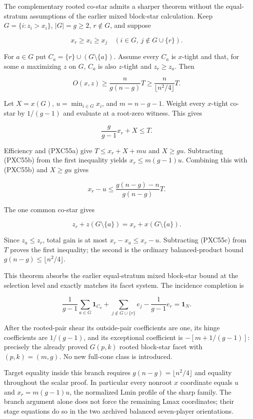 \documentclass[11pt]{article}
\newcommand{\one}{\mathbf 1}
\begin{document}
The complementary rooted co-star admits a sharper theorem without the
equal-stratum assumptions of the earlier mixed block-star calculation.  Keep
$G=\{i:z_i>x_i\}$, $|G|=g\ge2$, $r\notin G$, and suppose

\[
 x_r\ge x_i\ge x_j\quad(i\in G,\ j\notin G\cup\{r\}).                \tag{PXC55a}
\]

For $a\in G$ put $C_a=\{r\}\cup(G\setminus\{a\})$.  Assume every $C_a$
is $x$-tight and that, for some $a$ maximizing $z$ on $G$, $C_a$ is also
$z$-tight and $z_r\ge z_a$.  Then

\[
 \boxed{\qquad
 O(x,z)\ge\frac{n}{g(n-g)}T
          \ge\frac{n}{\lfloor n^2/4\rfloor}T .\qquad}               \tag{PXC55}
\]

Let $X=x(G)$, $u=\min_{i\in G}x_i$, and $m=n-g-1$.  Weight every
$x$-tight co-star by $1/(g-1)$ and evaluate at a root-zero witness.  This
gives

\[
 \frac g{g-1}x_r+X\le T.                            \tag{PXC55b}
\]

Efficiency and (PXC55a) give $T\le x_r+X+mu$ and $X\ge gu$.
Subtracting (PXC55b) from the first inequality yields
$x_r\le m(g-1)u$.  Combining this with (PXC55b) and $X\ge gu$ gives

\[
 x_r-u\le\frac{g(n-g)-n}{g(n-g)}T.                  \tag{PXC55c}
\]

The one common co-star gives

\[
 z_r+z(G\setminus\{a\})=x_r+x(G\setminus\{a\}).
\]

Since $z_a\le z_r$, total gain is at most $x_r-x_a\le x_r-u$.
Subtracting (PXC55c) from $T$ proves the first inequality; the second is the
ordinary balanced-product bound $g(n-g)\le\lfloor n^2/4\rfloor$.

This theorem absorbs the earlier equal-stratum mixed block-star bound at the
selection level and exactly matches its facet system.  The incidence
completion is

\[
 \frac1{g-1}\sum_{a\in G}\one_{C_a}
 +\sum_{j\notin G\cup\{r\}}e_j-\frac1{g-1}e_r=\one_N.               \tag{PXC55d}
\]

After the rooted-pair shear its outside-pair coefficients are one, its hinge
coefficients are $1/(g-1)$, and its exceptional coefficient is
$-[m+1/(g-1)]$: precisely the already proved $G(p,k)$ rooted block-star
facet with $(p,k)=(m,g)$.  No new full-cone class is introduced.

Target equality inside this branch requires
$g(n-g)=\lfloor n^2/4\rfloor$ and equality throughout the scalar proof.  In
particular every nonroot $x$ coordinate equals $u$ and
$x_r=m(g-1)u$, the normalized Lmin profile of the sharp family.  The branch
argument alone does not force the remaining Lmax coordinates; their stage
equations do so in the two archived balanced seven-player orientations.
\end{document}
